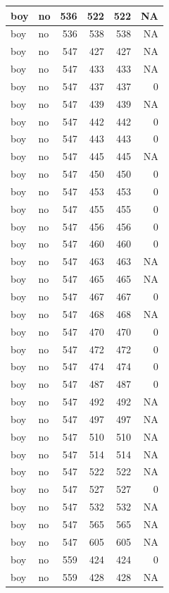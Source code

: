\documentclass[man]{apa6}
\begin{document}
\begin{tabular}{l|l|r|r|r|r}
\hline
boy & no & 536 & 522 & 522 & NA\\
\hline
boy & no & 536 & 538 & 538 & NA\\
\hline
boy & no & 547 & 427 & 427 & NA\\
\hline
boy & no & 547 & 433 & 433 & NA\\
\hline
boy & no & 547 & 437 & 437 & 0\\
\hline
boy & no & 547 & 439 & 439 & NA\\
\hline
boy & no & 547 & 442 & 442 & 0\\
\hline
boy & no & 547 & 443 & 443 & 0\\
\hline
boy & no & 547 & 445 & 445 & NA\\
\hline
boy & no & 547 & 450 & 450 & 0\\
\hline
boy & no & 547 & 453 & 453 & 0\\
\hline
boy & no & 547 & 455 & 455 & 0\\
\hline
boy & no & 547 & 456 & 456 & 0\\
\hline
boy & no & 547 & 460 & 460 & 0\\
\hline
boy & no & 547 & 463 & 463 & NA\\
\hline
boy & no & 547 & 465 & 465 & NA\\
\hline
boy & no & 547 & 467 & 467 & 0\\
\hline
boy & no & 547 & 468 & 468 & NA\\
\hline
boy & no & 547 & 470 & 470 & 0\\
\hline
boy & no & 547 & 472 & 472 & 0\\
\hline
boy & no & 547 & 474 & 474 & 0\\
\hline
boy & no & 547 & 487 & 487 & 0\\
\hline
boy & no & 547 & 492 & 492 & NA\\
\hline
boy & no & 547 & 497 & 497 & NA\\
\hline
boy & no & 547 & 510 & 510 & NA\\
\hline
boy & no & 547 & 514 & 514 & NA\\
\hline
boy & no & 547 & 522 & 522 & NA\\
\hline
boy & no & 547 & 527 & 527 & 0\\
\hline
boy & no & 547 & 532 & 532 & NA\\
\hline
boy & no & 547 & 565 & 565 & NA\\
\hline
boy & no & 547 & 605 & 605 & NA\\
\hline
boy & no & 559 & 424 & 424 & 0\\
\hline
boy & no & 559 & 428 & 428 & NA\\

\end{tabular}
\end{document}
